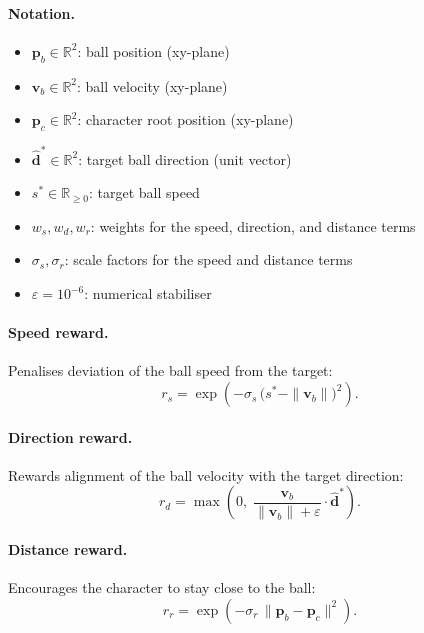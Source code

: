 \documentclass[10pt,twocolumn,letterpaper]{article}
\begin{document}
\paragraph{Notation.}
\begin{itemize}
    \item $\mathbf{p}_b \in \mathbb{R}^2$: ball position (xy-plane)
    \item $\mathbf{v}_b \in \mathbb{R}^2$: ball velocity (xy-plane)
    \item $\mathbf{p}_c \in \mathbb{R}^2$: character root position (xy-plane)
    \item $\hat{\mathbf{d}}^* \in \mathbb{R}^2$: target ball direction (unit vector)
    \item $s^* \in \mathbb{R}_{\geq 0}$: target ball speed
    \item $w_s, w_d, w_r$: weights for the speed, direction, and distance terms
    \item $\sigma_s, \sigma_r$: scale factors for the speed and distance terms
    \item $\varepsilon = 10^{-6}$: numerical stabiliser
\end{itemize}

\paragraph{Speed reward.} Penalises deviation of the ball speed from the target:
\begin{equation}
    r_s = \exp\!\left(-\sigma_s \, \bigl(s^* - \|\mathbf{v}_b\|\bigr)^2\right).
\end{equation}

\paragraph{Direction reward.} Rewards alignment of the ball velocity with the
target direction:
\begin{equation}
    r_d = \max\!\left(0,\; \frac{\mathbf{v}_b}{\|\mathbf{v}_b\| + \varepsilon} \cdot \hat{\mathbf{d}}^*\right).
\end{equation}

\paragraph{Distance reward.} Encourages the character to stay close to the ball:
\begin{equation}
    r_r = \exp\!\left(-\sigma_r \, \|\mathbf{p}_b - \mathbf{p}_c\|^2\right).
\end{equation}
\end{document}

